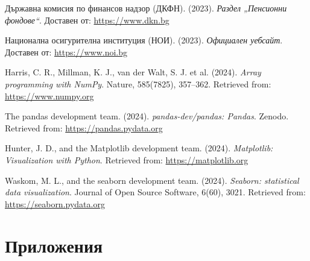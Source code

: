 \documentclass[a4paper,12pt]{article}
\begin{document}
\begin{thebibliography}{99}
        Държавна комисия по финансов надзор (ДКФН). (2023).
        \emph{Раздел „Пенсионни фондове“}.
        Доставен от: \url{https://www.dkn.bg}

        Национална осигурителна институция (НОИ). (2023).
        \emph{Официален уебсайт}.
        Доставен от: \url{https://www.noi.bg}

        Harris, C. R., Millman, K. J., van der Walt, S. J. et al. (2024).
        \emph{Array programming with NumPy}.
        Nature, 585(7825), 357–362.
        Retrieved from: \url{https://www.numpy.org}

        The pandas development team. (2024).
        \emph{pandas-dev/pandas: Pandas}.
        Zenodo.
        Retrieved from: \url{https://pandas.pydata.org}

        Hunter, J. D., and the Matplotlib development team. (2024).
        \emph{Matplotlib: Visualization with Python}.
        Retrieved from: \url{https://matplotlib.org}

        Waskom, M. L., and the seaborn development team. (2024).
        \emph{Seaborn: statistical data visualization}.
        Journal of Open Source Software, 6(60), 3021.
        Retrieved from: \url{https://seaborn.pydata.org}
\end{thebibliography}
\newpage
\section{Приложения}





\end{document}
